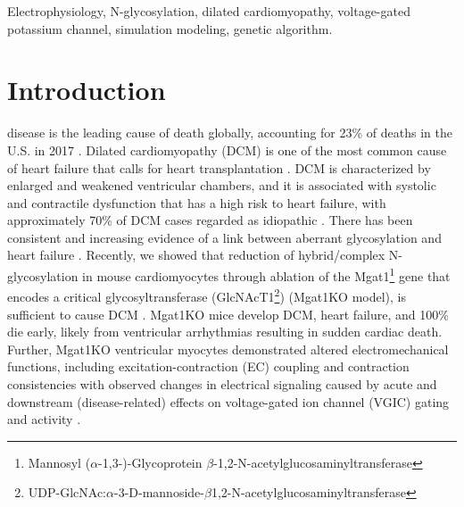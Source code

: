 \documentclass[journal]{IEEEtran}
\begin{document}
\begin{IEEEkeywords}
Electrophysiology, N-glycosylation, dilated cardiomyopathy, voltage-gated potassium channel, simulation modeling, genetic algorithm. 
\end{IEEEkeywords}

%
\IEEEpeerreviewmaketitle

\section{Introduction}
 disease is the leading cause of death globally, accounting for 23\% of deaths in the U.S. in 2017 \cite{cdc2019deaths}. Dilated cardiomyopathy (DCM) is one of the most common cause of heart failure that calls for heart transplantation \cite{weintraub2017dilated}. DCM is characterized by enlarged and weakened ventricular chambers, and it is associated with systolic and contractile dysfunction that has a high risk to heart failure, with approximately 70\% of DCM cases regarded as idiopathic \cite{weintraub2017dilated, lakdawala2013dilated, hershberger2011update}. There has been consistent and increasing evidence of a link between aberrant glycosylation and heart failure \cite{barrans2002global, hwang2002microarray, yung2004gene, nishio1995identification, knezevic2009variability, miura2016glycomics, nagai2016aberrant, yang2015glycoproteins, jacob2013altered, ufret2001role, gehrmann2003cardiomyopathy, marques2017cardiac}. Recently, we showed that reduction of hybrid/complex N-glycosylation in mouse cardiomyocytes through ablation of the Mgat1\footnote{Mannosyl ($\alpha$-1,3-)-Glycoprotein $\beta$-1,2-N-acetylglucosaminyltransferase} gene that encodes a critical glycosyltransferase (GlcNAcT1\footnote{UDP-GlcNAc:$\alpha$-3-D-mannoside-$\beta$1,2-N-acetylglucosaminyltransferase}) (Mgat1KO model), is sufficient to cause DCM \cite{ednie2019reduced, ednie2019reduced2}. Mgat1KO mice develop DCM, heart failure, and 100\% die early, likely from ventricular arrhythmias resulting in sudden cardiac death. Further, Mgat1KO ventricular myocytes demonstrated altered electromechanical functions, including excitation-contraction (EC) coupling and contraction consistencies with observed changes in electrical signaling caused by acute and downstream (disease-related) effects on voltage-gated ion channel (VGIC) gating and activity \cite{ednie2019reduced}. 
\end{document}
